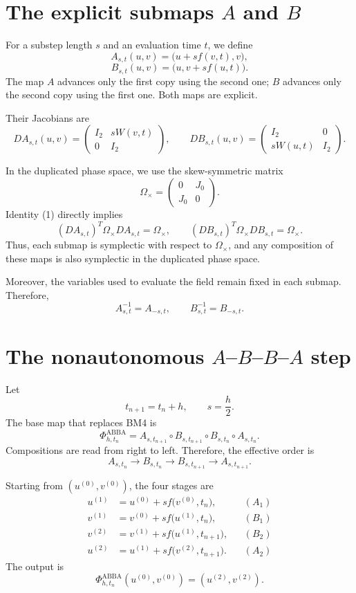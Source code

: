 \documentclass[11pt,a4paper]{article}
\newcommand{\Id}{I}
\newcommand{\Om}{\Omega_{\times}}
\newcommand{\PhiAB}{\Phi^{\mathrm{ABBA}}_{h,t_n}}
\begin{document}
\section{The explicit submaps \texorpdfstring{$A$}{A} and \texorpdfstring{$B$}{B}}

For a substep length $s$ and an evaluation time $t$, we define
\[
 A_{s,t}(u,v)=\bigl(u+s f(v,t),v\bigr), \tag{2}
\]
\[
 B_{s,t}(u,v)=\bigl(u,v+s f(u,t)\bigr). \tag{3}
\]
The map $A$ advances only the first copy using the second one; $B$ advances only the
second copy using the first one. Both maps are explicit.

Their Jacobians are
\[
 DA_{s,t}(u,v)=
 \begin{pmatrix}
  \Id_2&sW(v,t)\\
  0&\Id_2
 \end{pmatrix},
 \qquad
 DB_{s,t}(u,v)=
 \begin{pmatrix}
  \Id_2&0\\
  sW(u,t)&\Id_2
 \end{pmatrix}. \tag{4}
\]

In the duplicated phase space, we use the skew-symmetric matrix
\[
 \Om=
 \begin{pmatrix}
  0&J_0\\
  J_0&0
 \end{pmatrix}.
\]
Identity (1) directly implies
\[
 (DA_{s,t})^T\Om DA_{s,t}=\Om,
 \qquad
 (DB_{s,t})^T\Om DB_{s,t}=\Om.
\]
Thus, each submap is symplectic with respect to $\Om$, and any composition of these maps is
also symplectic in the duplicated phase space.

Moreover, the variables used to evaluate the field remain fixed in each submap. Therefore,
\[
 \boxed{A_{s,t}^{-1}=A_{-s,t},\qquad B_{s,t}^{-1}=B_{-s,t}.} \tag{5}
\]

\section{The nonautonomous \texorpdfstring{$A$--$B$--$B$--$A$}{A-B-B-A} step}

Let
\[
 t_{n+1}=t_n+h,
 \qquad
 s=\frac h2.
\]
The base map that replaces BM4 is
\[
 \boxed{
 \PhiAB
 =A_{s,t_{n+1}}
  \circ B_{s,t_{n+1}}
  \circ B_{s,t_n}
  \circ A_{s,t_n}.
 } \tag{6}
\]
Compositions are read from right to left. Therefore, the effective order is
\[
 A_{s,t_n}\longrightarrow B_{s,t_n}
 \longrightarrow B_{s,t_{n+1}}\longrightarrow A_{s,t_{n+1}}.
\]

Starting from $(u^{(0)},v^{(0)})$, the four stages are
\begin{align}
 u^{(1)}
 &=u^{(0)}+s f\bigl(v^{(0)},t_n\bigr), &&(A_1) \tag{7a}\\
 v^{(1)}
 &=v^{(0)}+s f\bigl(u^{(1)},t_n\bigr), &&(B_1) \tag{7b}\\
 v^{(2)}
 &=v^{(1)}+s f\bigl(u^{(1)},t_{n+1}\bigr), &&(B_2) \tag{7c}\\
 u^{(2)}
 &=u^{(1)}+s f\bigl(v^{(2)},t_{n+1}\bigr). &&(A_2) \tag{7d}
\end{align}
The output is
\[
 \PhiAB(u^{(0)},v^{(0)})=(u^{(2)},v^{(2)}).
\]
\end{document}
